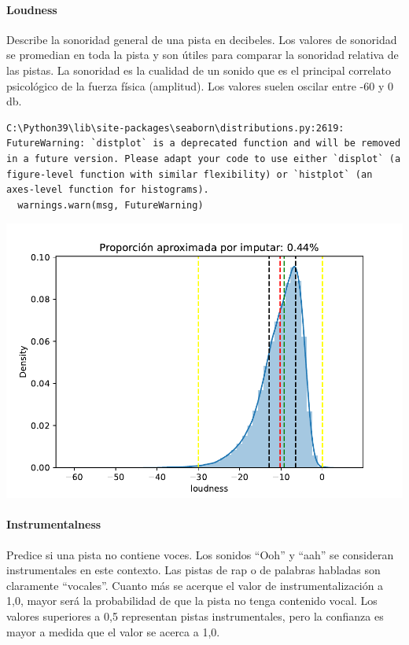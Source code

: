 \documentclass[
  letterpaper,
  DIV=11,
  numbers=noendperiod]{scrartcl}
\let\oldparagraph\paragraph
\renewcommand{\paragraph}[1]{\oldparagraph{#1}\mbox{}}
\begin{document}
\hypertarget{loudness}{%
\paragraph{Loudness}\label{loudness}}

Describe la sonoridad general de una pista en decibeles. Los valores de
sonoridad se promedian en toda la pista y son útiles para comparar la
sonoridad relativa de las pistas. La sonoridad es la cualidad de un
sonido que es el principal correlato psicológico de la fuerza física
(amplitud). Los valores suelen oscilar entre -60 y 0 db.

\begin{verbatim}
C:\Python39\lib\site-packages\seaborn\distributions.py:2619: FutureWarning: `distplot` is a deprecated function and will be removed in a future version. Please adapt your code to use either `displot` (a figure-level function with similar flexibility) or `histplot` (an axes-level function for histograms).
  warnings.warn(msg, FutureWarning)
\end{verbatim}

\includegraphics{informe_01_files/figure-pdf/unnamed-chunk-10-1.pdf}

\hypertarget{instrumentalness}{%
\paragraph{Instrumentalness}\label{instrumentalness}}

Predice si una pista no contiene voces. Los sonidos ``Ooh'' y ``aah'' se
consideran instrumentales en este contexto. Las pistas de rap o de
palabras habladas son claramente ``vocales''. Cuanto más se acerque el
valor de instrumentalización a 1,0, mayor será la probabilidad de que la
pista no tenga contenido vocal. Los valores superiores a 0,5 representan
pistas instrumentales, pero la confianza es mayor a medida que el valor
se acerca a 1,0.
\end{document}
